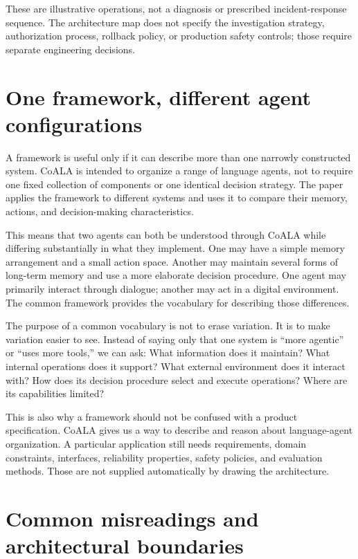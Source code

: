 These are illustrative operations, not a diagnosis or prescribed incident-response sequence. The architecture map does not specify the investigation strategy, authorization process, rollback policy, or production safety controls; those require separate engineering decisions.

\section{One framework, different agent configurations}

A framework is useful only if it can describe more than one narrowly constructed system. CoALA is intended to organize a range of language agents, not to require one fixed collection of components or one identical decision strategy. The paper applies the framework to different systems and uses it to compare their memory, actions, and decision-making characteristics.

This means that two agents can both be understood through CoALA while differing substantially in what they implement. One may have a simple memory arrangement and a small action space. Another may maintain several forms of long-term memory and use a more elaborate decision procedure. One agent may primarily interact through dialogue; another may act in a digital environment. The common framework provides the vocabulary for describing those differences.

The purpose of a common vocabulary is not to erase variation. It is to make variation easier to see. Instead of saying only that one system is “more agentic” or “uses more tools,” we can ask: What information does it maintain? What internal operations does it support? What external environment does it interact with? How does its decision procedure select and execute operations? Where are its capabilities limited?

This is also why a framework should not be confused with a product specification. CoALA gives us a way to describe and reason about language-agent organization. A particular application still needs requirements, domain constraints, interfaces, reliability properties, safety policies, and evaluation methods. Those are not supplied automatically by drawing the architecture.

\section{Common misreadings and architectural boundaries}

